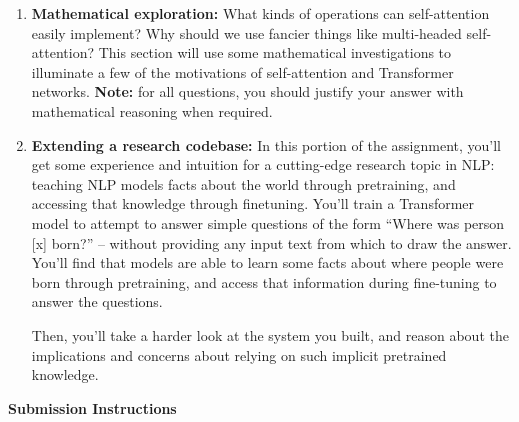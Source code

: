 \documentclass[answers]{exam}
\begin{document}
\begin{enumerate}
\item \textbf{Mathematical exploration:}  What kinds of operations can self-attention easily implement? Why should we use fancier things like multi-headed self-attention?
This section will use some mathematical investigations to illuminate a few of the motivations of self-attention and Transformer networks.
{\color{red} \textbf{Note:} for all questions, you should justify your answer with mathematical reasoning when required.}

\item \textbf{Extending a research codebase:}
In this portion of the assignment, you'll get some experience and intuition for a cutting-edge research topic in NLP: teaching NLP models facts about the world through pretraining, and accessing that knowledge through finetuning.
You'll train a Transformer model to attempt to answer simple questions of the form ``Where was person [x] born?'' -- without providing any input text from which to draw the answer.
You'll find that models are able to learn some facts about where people were born through pretraining, and access that information during fine-tuning to answer the questions.

Then, you'll take a harder look at the system you built, and reason about the implications and concerns about relying on such implicit pretrained knowledge.

\end{enumerate}

\newpage

\begin{questions}
   
   
   
\end{questions}

\Large{\textbf{Submission Instructions}}
\end{document}
